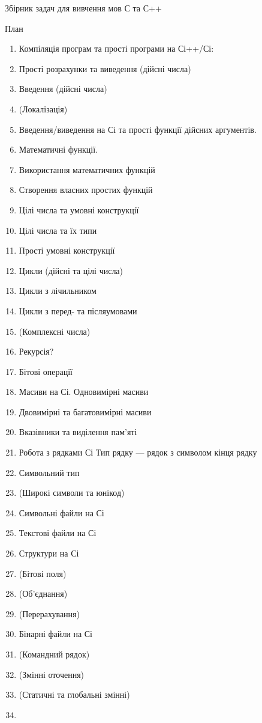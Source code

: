 \documentclass[]{article}
\date{}
\begin{document}
Збірник задач для вивчення мов С та С++

План

\begin{enumerate}
\item
Компіляція програм та прості програми на Сі++/Сі:
\item
Прості розрахунки та виведення (дійсні числа)
\item
Введення (дійсні числа)
\item
(Локалізація)
\item
Введення/виведення на Сі та прості функції дійсних аргументів.
\item
Математичні функції.
\item
Використання математичних функцій
\item
Створення власних простих функцій
\item
Цілі числа та умовні конструкції
\item
Цілі числа та їх типи
\item
Прості умовні конструкції
\item
Цикли (дійсні та цілі числа)
\item
Цикли з лічильником
\item
Цикли з перед- та післяумовами
\item
(Комплексні числа)
\item
Рекурсія?
\item
Бітові операції
\item
Масиви на Сі. Одновимірні масиви
\item
Двовимірні та багатовимірні масиви
\item
Вказівники та виділення пам'яті
\item
Робота з рядками Сі
Тип рядку --- рядок з символом кінця рядку
\item
Символьний тип
\item
(Широкі символи та юнікод)
\item
Символьні файли на Сі
\item
Текстові файли на Сі
\item
Структури на Сі
\item
(Бітові поля)
\item
(Об'єднання)
\item
(Перерахування)
\item
Бінарні файли на Сі
\item
(Командний рядок)
\item
(Змінні оточення)
\item
(Статичні та глобальні змінні)
\item

\end{enumerate}
\end{document}
